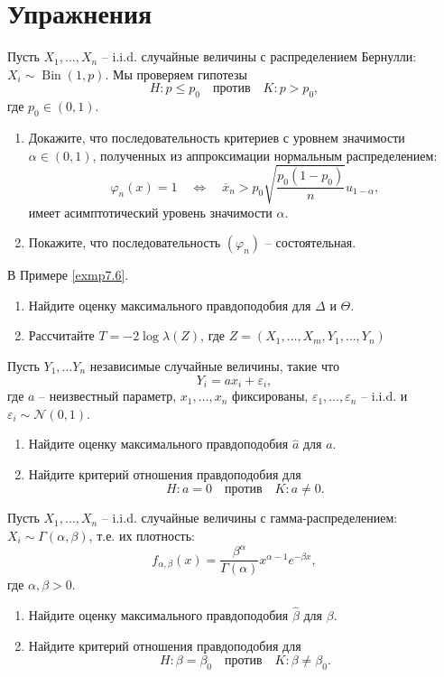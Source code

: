 \section*{Упражнения}
\begin{exc}
	Пусть $X_1, \dots, X_n$ -- i.i.d. случайные величины с распределением Бернулли: $X_i \sim \operatorname{Bin}(1, p)$. Мы проверяем гипотезы
	\[ H: p \leq p_0 \quad \text{против} \quad K: p > p_0, \]
	где $p_0 \in (0, 1)$.
	\begin{enumerate}
		\item Докажите, что последовательность критериев с уровнем значимости $\alpha \in (0, 1)$, полученных из аппроксимации нормальным распределением:
		\[ \varphi_n(x) = 1 \quad \Leftrightarrow \quad \overline{x}_n > p_0 \sqrt{\frac{p_0(1-p_0)}{n}} u_{1-\alpha}, \]
		имеет асимптотический уровень значимости $\alpha$.
		\item Покажите, что последовательность $(\varphi_n)$ -- состоятельная.
	\end{enumerate}
\end{exc}

\begin{exc}
	В Примере \ref{exmp7.6}.
	\begin{enumerate}
		\item Найдите оценку максимального правдоподобия для $\Delta$ и $\Theta$.
		\item Рассчитайте $T = -2\log \lambda(Z)$, где $Z = (X_1,\dots, X_m, Y_1, \dots, Y_n)$
	\end{enumerate}
\end{exc}

\begin{exc}
	Пусть $Y_1, \dots Y_n$ независимые случайные величины, такие что
	\[ Y_i = a x_i + \varepsilon_i, \]
	где $a$ -- неизвестный параметр, $x_1, \dots, x_n$ фиксированы, $\varepsilon_1, \dots, \varepsilon_n$ -- i.i.d. и $\varepsilon_i \sim \mathcal{N}(0, 1)$. 
	\begin{enumerate}
		\item Найдите оценку максимального правдоподобия $\hat{a}$ для $a$.
		\item Найдите критерий отношения правдоподобия для 
		\[ H:a = 0 \quad \text{против} \quad K: a \neq 0. \]
	\end{enumerate}
\end{exc}

\begin{exc}
	Пусть $X_1, \dots, X_n$ -- i.i.d. случайные величины с гамма-распределением: $X_i \sim \Gamma(\alpha, \beta)$, т.е. их плотность:
	\[ f_{\alpha, \beta}(x) = \frac{\beta^\alpha}{\Gamma(\alpha)} x^{\alpha - 1} e^{-\beta x}, \]
	где $\alpha, \beta > 0$.
	\begin{enumerate}
		\item Найдите оценку максимального правдоподобия $\hat{\beta}$ для $\beta$.
		\item Найдите критерий отношения правдоподобия для 
		\[ H:\beta = \beta_0 \quad \text{против} \quad K: \beta \neq \beta_0. \]
	\end{enumerate}
\end{exc}

